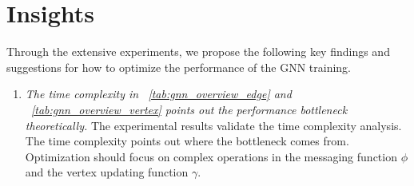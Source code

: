 \section{Insights}
\label{sec:insights}

Through the extensive experiments, we propose the following key findings and suggestions for how to optimize the performance of the GNN training.

\begin{enumerate}
    \item \emph{The time complexity in \tablename~\ref{tab:gnn_overview_edge} and \tablename~\ref{tab:gnn_overview_vertex} points out the performance bottleneck theoretically.}
          The experimental results validate the time complexity analysis.
          The time complexity points out where the bottleneck comes from.
          Optimization should focus on complex operations in the messaging function $\phi$ and the vertex updating function $\gamma$.


\end{enumerate}
